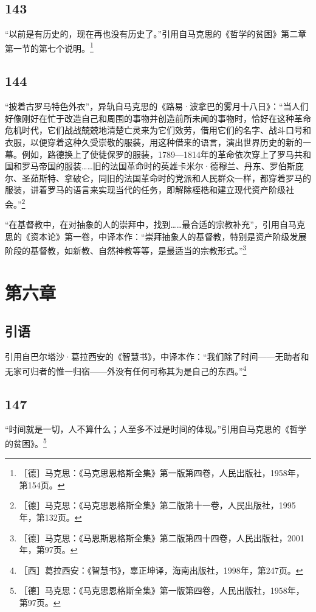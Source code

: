 \documentclass[fontset=fandol, a4paper, 12pt, openright]{ctexbook}
\begin{document}
\subsection*{143}
“以前是有历史的，现在再也没有历史了。”引用自马克思的《哲学的贫困》第二章第一节的第七个说明。\footnote{［德］马克思：《马克思恩格斯全集》第一版第四卷，人民出版社，1958年，第154页。}

\subsection*{144}
“披着古罗马特色外衣”，异轨自马克思的《路易·波拿巴的雾月十八日》：“当人们好像刚好在忙于改造自己和周围的事物并创造前所未闻的事物时，恰好在这种革命危机时代，它们战战兢兢地清楚亡灵来为它们效劳，借用它们的名字、战斗口号和衣服，以便穿着这种久受崇敬的服装，用这种借来的语言，演出世界历史的新的一幕。例如，路德换上了使徒保罗的服装，1789—1814年的革命依次穿上了罗马共和国和罗马帝国的服装……旧的法国革命时的英雄卡米尔·德穆兰、丹东、罗伯斯庇尔、圣茹斯特、拿破仑，同旧的法国革命时的党派和人民群众一样，都穿着罗马的服装，讲着罗马的语言来实现当代的任务，即解除桎梏和建立现代资产阶级社会。”\footnote{［德］马克思：《马克思恩格斯全集》第二版第十一卷，人民出版社，1995年，第132页。}

“在基督教中，在对抽象的人的崇拜中，找到……最合适的宗教补充”，引用自马克思的《资本论》第一卷，中译本作：“崇拜抽象人的基督教，特别是资产阶级发展阶段的基督教，如新教、自然神教等等，是最适当的宗教形式。”\footnote{［德］马克思：《马恩斯恩格斯全集》第二版第四十四卷，人民出版社，2001年，第97页。}

\section*{第六章}

\subsection*{引语}
引用自巴尔塔沙·葛拉西安的《智慧书》，中译本作：“我们除了时间——无助者和无家可归者的惟一归宿——外没有任何可称其为是自己的东西。”\footnote{［西］葛拉西安：《智慧书》，辜正坤译，海南出版社，1998年，第247页。}

\subsection*{147}
“时间就是一切，人不算什么；人至多不过是时间的体现。”引用自马克思的《哲学的贫困》。\footnote{［德］马克思：《马克思恩格斯全集》第一版第四卷，人民出版社，1958年，第97页。}
\end{document}

